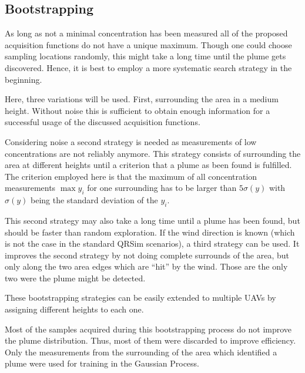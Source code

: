\subsection{Bootstrapping}
As long as not a minimal concentration has been measured all of the proposed 
acquisition functions do not have a unique maximum. Though one could choose 
sampling locations randomly, this might take a long time until the plume gets 
discovered.  Hence, it is best to employ a more systematic search strategy in 
the beginning.

Here, three variations will be used. First, surrounding the area in a medium 
height.  Without noise this is sufficient to obtain enough information for 
a successful usage of the discussed acquisition functions.

Considering noise a second strategy is needed as measurements of low 
concentrations are not reliably anymore. This strategy consists of surrounding 
the area at different heights until a criterion that a plume as been found is 
fulfilled. The criterion employed here is that the maximum of all concentration 
measurements $\max y_i$ for one surrounding has to be larger than $5\sigma(y)$ 
with $\sigma(y)$ being the standard deviation of the $y_i$.

This second strategy may also take a long time until a plume has been found, but 
should be faster than random exploration. If the wind direction is known (which 
is not the case in the standard QRSim scenarios), a third strategy can be used. 
It improves the second strategy by not doing complete surrounds of the area, but 
only along the two area edges which are ``hit'' by the wind. Those are the only 
two were the plume might be detected.

These bootstrapping strategies can be easily extended to multiple UAVs by 
assigning different heights to each one.

Most of the samples acquired during this bootstrapping process do not improve 
the plume distribution. Thus, most of them were discarded to improve efficiency.  
Only the measurements from the surrounding of the area which identified a plume 
were used for training in the Gaussian Process.

